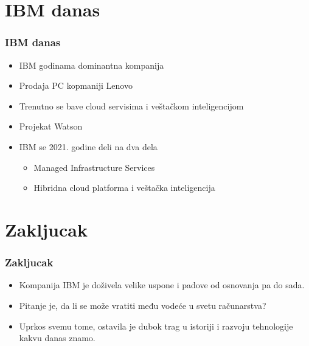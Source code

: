 \documentclass{beamer}
\begin{document}
\section{IBM danas}

\begin{frame}[fragile]\frametitle{IBM danas}
	\begin{itemize}	
		\item IBM godinama dominantna kompanija
		\item Prodaja PC kopmaniji Lenovo 
		\item Trenutno se bave cloud servisima i veštačkom inteligencijom
            \item Projekat Watson
            \item IBM se 2021. godine deli na dva dela
            \begin{itemize}
	       \item Managed Infrastructure Services
	       \item Hibridna cloud platforma i veštačka inteligencija
	    \end{itemize}
            
	\end{itemize}
\end{frame}

\section{Zakljucak}

\begin{frame}[fragile]\frametitle{Zakljucak}
	\begin{itemize}	
	\item Kompanija IBM je doživela velike uspone i padove od osnovanja pa do sada.
        \item Pitanje je, da li se može vratiti među vodeće u svetu računarstva?
        \item Uprkos svemu tome, ostavila je dubok trag u istoriji i razvoju tehnologije kakvu danas znamo.
	\end{itemize}
\end{frame}
\end{document}
